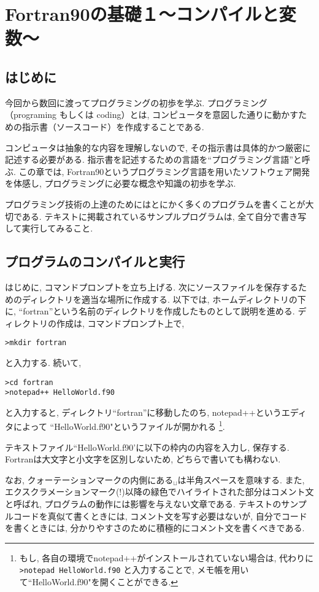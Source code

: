 \chapter{Fortran90の基礎１〜コンパイルと変数〜}

\section{はじめに}
今回から数回に渡ってプログラミングの初歩を学ぶ. 
プログラミング（programing もしくは coding）とは, 
コンピュータを意図した通りに動かすための指示書（ソースコード）を作成することである. 

コンピュータは抽象的な内容を理解しないので, その指示書は具体的かつ厳密に記述する必要がある. 
指示書を記述するための言語を``プログラミング言語''と呼ぶ. 
この章では, Fortran90というプログラミング言語を用いたソフトウェア開発を体感し, 
プログラミングに必要な概念や知識の初歩を学ぶ. 

プログラミング技術の上達のためにはとにかく多くのプログラムを書くことが大切である. 
テキストに掲載されているサンプルプログラムは, 
全て自分で書き写して実行してみること. 

\section{プログラムのコンパイルと実行}
はじめに, コマンドプロンプトを立ち上げる.
次にソースファイルを保存するためのディレクトリを適当な場所に作成する.
以下では, ホームディレクトリの下に, ``fortran''という名前のディレクトリを作成したものとして説明を進める.
ディレクトリの作成は, コマンドプロンプト上で,
\begin{Verbatim}[frame=single]
>mkdir fortran
\end{Verbatim}
と入力する. 続いて, 
\begin{Verbatim}[frame=single]
>cd fortran
>notepad++ HelloWorld.f90
\end{Verbatim}
と入力すると, 
ディレクトリ``fortran''に移動したのち, notepad++というエディタによって
``HelloWorld.f90"というファイルが開かれる
\footnote{もし, 各自の環境でnotepad++がインストールされていない場合は, 代わりに
\verb|>notepad HelloWorld.f90|
と入力することで, メモ帳を用いて``HelloWorld.f90"を開くことができる. 
}.

テキストファイル``HelloWorld.f90'に以下の枠内の内容を入力し, 保存する.
Fortranは大文字と小文字を区別しないため, どちらで書いても構わない.

なお, クォーテーションマークの内側にある$_{\sqcup}$は半角スペースを意味する.
また, エクスクラメーションマーク(!)以降の緑色でハイライトされた部分はコメント文と呼ばれ,
プログラムの動作には影響を与えない文章である.
テキストのサンプルコードを真似て書くときには, コメント文を写す必要はないが,
自分でコードを書くときには, 分かりやすさのために積極的にコメント文を書くべきである.

